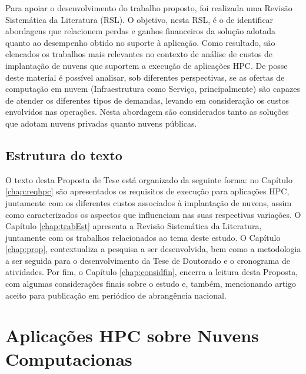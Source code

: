 \documentclass[tese,capa]{texufpel}
\begin{document}
Para apoiar o desenvolvimento do trabalho proposto, foi realizada uma Revisão Sistemática da Literatura (RSL). O objetivo, nesta RSL, é o de identificar abordagens que relacionem perdas e ganhos financeiros da solução adotada quanto ao desempenho obtido no suporte à aplicação. Como resultado, são elencados os trabalhos mais relevantes no contexto de análise de custos de implantação de nuvens que suportem a execução de aplicações HPC. De posse deste material é possível analisar, sob diferentes perspectivas, se as ofertas de computação em nuvem (Infraestrutura como Serviço, principalmente) são capazes de atender os diferentes tipos de demandas, levando em consideração os custos envolvidos nas operações. Nesta abordagem são considerados tanto as soluções que adotam nuvens privadas quanto nuvens públicas.

\section{Estrutura do texto}\label{sec:esttexto}

O texto desta Proposta de Tese está organizado da seguinte forma: no Capítulo \ref{chap:reqhpc} são apresentados os requisitos de execução para aplicações HPC, juntamente com os diferentes custos associados à implantação de nuvens, assim como caracterizados os aspectos que influenciam nas suas respectivas variações. O Capítulo \ref{chap:trabEst} apresenta a Revisão Sistemática da Literatura, juntamente com os trabalhos relacionados ao tema deste estudo. O Capítulo \ref{chap:prop}, contextualiza a pesquisa a ser desenvolvida, bem como a metodologia a ser seguida para o desenvolvimento da Tese de Doutorado e o cronograma de atividades. Por fim, o Capítulo \ref{chap:considfin}, encerra a leitura desta Proposta, com algumas considerações finais sobre o estudo e, também, mencionando artigo aceito para publicação em periódico de abrangência nacional.\\


\chapter{Aplicações HPC sobre Nuvens Computacionas}\label{chap:aplicacoes}
\end{document}
